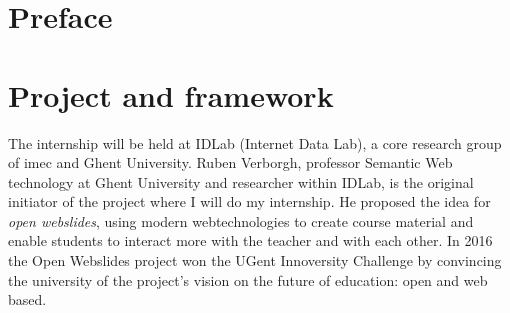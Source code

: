 \documentclass[10pt,a4paper]{article}
\makeatletter
\newcommand{\coursename}{Internship Applied Computer Science}
\newcommand{\courseyear}{Academy year 2017-2018}
\newcommand{\documenttitle}{Internship report}
\newcommand{\authoronename}{Jasper D'haene}
\newcommand{\authoroneemail}{jasper.dhaene@gmail.com}
\newcommand{\authortwoname}{Florian Dejonckheere}
\newcommand{\authortwoemail}{florian@dejonckhee.re}
\newcommand{\hogentlogo}{hogent-logo.png}
\newcommand{\hogentheader}{header.png}
\newcommand{\florian}[1]{\ifthenelse{\isundefined{\isflorian}}{}{#1}}
\newcommand{\jasper}[1]{\ifthenelse{\isundefined{\isjasper}}{}{#1}}
\newcommand{\isflorian}{}
\makeatother
\begin{document}

  \nopagecolor
  \renewcommand{\footrulewidth}{0.4pt}
  \headheight 45pt
  \ULCornerWallPaper{1}{\hogentheader}
  \fancyfoot[C]{\thepage}

  \tableofcontents

  \cleardoublepage{}

  \section{Preface}

  \section{Project and framework}
    The internship will be held at IDLab (Internet Data Lab), a core research group of imec and Ghent University. Ruben Verborgh, professor Semantic Web technology at Ghent University and researcher within IDLab, is the original initiator of the project where I will do my internship. He proposed the idea for \textit{open webslides}, using modern webtechnologies to create course material and enable students to interact more with the teacher and with each other. In 2016 the Open Webslides project won the UGent Innoversity Challenge by convincing the university of the project's vision on the future of education: open and web based.
    
\end{document}
